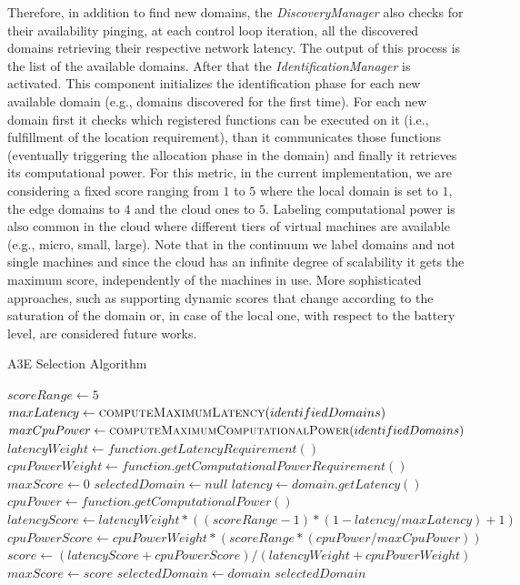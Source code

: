 Therefore, in addition to find new domains, the \textit{DiscoveryManager} also checks for their availability pinging, at each control loop iteration, all the discovered domains retrieving their respective network latency. The output of this process is the list of the available domains. After that the \textit{IdentificationManager} is activated. This component initializes the identification phase for each new available domain (e.g., domains discovered for the first time). For each new domain first it checks which registered functions can be executed on it (i.e., fulfillment of the location requirement), than it communicates those functions (eventually triggering the allocation phase in the domain) and finally it retrieves its computational power. For this metric, in the current implementation, we are considering a fixed score ranging from $1$ to $5$ where the local domain is set to $1$, the edge domains to $4$ and the cloud ones to $5$. Labeling computational power is also common in the cloud where different tiers of virtual machines are available (e.g., micro, small, large). Note that in the continuum we label domains and not single machines and since the cloud has an infinite degree of scalability it gets the maximum score, independently of the machines in use. More sophisticated approaches, such as supporting dynamic scores that change according to the saturation of the domain or, in case of the local one, with respect to the battery level, are considered future works.  

\begin{algorithm}[b]
	\caption{A3E Selection Algorithm}
	\label{alg:selection}
	\begin{algorithmic}[1]
		
		\State$scoreRange \gets 5$
		\State $maxLatency \gets \Call{computeMaximumLatency}{identifiedDomains}$
		\State $maxCpuPower \gets \Call{computeMaximumComputationalPower}{identifiedDomains}$
		\State $latencyWeight \gets function.getLatencyRequirement()$ 
		\State $cpuPowerWeight \gets function.getComputationalPowerRequirement()$ 
		\State $maxScore \gets 0$
		\State $selectedDomain \gets null$
		\State $latency \gets domain.getLatency()$ 
		\State $cpuPower \gets function.getComputationalPower()$ 
		\State $latencyScore \gets latencyWeight*((scoreRange-1)*(1 - latency/maxLatency)+1)$ 
		\State $cpuPowerScore \gets cpuPowerWeight*(scoreRange*(cpuPower/maxCpuPower))$
		\State $score \gets (latencyScore + cpuPowerScore) / (latencyWeight + cpuPowerWeight)$
		\State $maxScore \gets score$
		\State $selectedDomain \gets domain$
		\EndIf
		\EndFor 
		\State \Return $selectedDomain$
		\EndFunction
	\end{algorithmic}
\end{algorithm}

